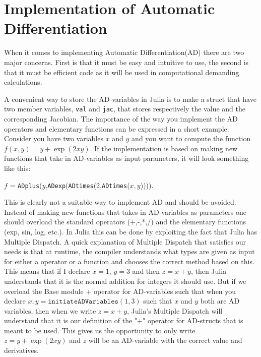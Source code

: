 \section{Implementation of Automatic Differentiation}
When it comes to implementing Automatic Differentiation(AD) there are two major concerns. First is that it must be easy and intuitive to use, the second is that it must be efficient code as it will be used in computational demanding calculations. 

A convenient way to store the AD-variables in Julia is to make a struct that have two member variables, \texttt{val} and \texttt{jac}, that stores respectively the value and the corresponding Jacobian. The importance of the way you implement the AD operators and elementary functions can be expressed in a short example: Consider you have two variables $x$ and $y$ and you want to compute the function $f(x,y) = y+\exp(2xy)$. If the implementation is based on making new functions that take in AD-variables as input parameters, it will look something like this: 
\begin{center}
    $f$ = \texttt{ADplus}($y$,\texttt{ADexp}(\texttt{ADtimes}(2,\texttt{ADtimes}($x,y$)))).
\end{center}
This is clearly not a suitable way to implement AD and should be avoided. Instead of making new functions that takes in AD-variables as parameters one should overload the standard operators (+,-,*,/) and the elementary functions (exp, sin, log, etc.). In Julia this can be done by exploiting the fact that Julia has Multiple Dispatch. A quick explanation of Multiple Dispatch that satisfies our needs is that at runtime, the compiler understands what types are given as input for either a operator or a function and chooses the correct method based on this. This means that if I declare $x = 1$, $y = 3$ and then $z = x+y$, then Julia understands that it is the normal addition for integers it should use. But if we overload the Base module + operator for AD-variables such that when you declare $x,y = \texttt{initiateADVariables}(1,3)$ such that $x$ and $y$ both are AD variables, then when we write $z = x+y$, Julia's Multiple Dispatch will understand that it is our definition of the "+" operator for AD-structs that is meant to be used. This gives us the opportunity to only write $z = y+\exp(2xy)$ and $z$ will be an AD-variable with the correct value and derivatives. 

